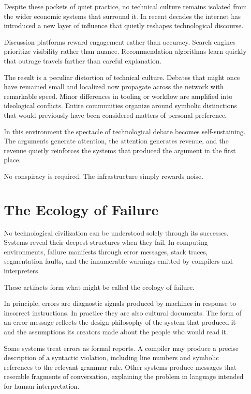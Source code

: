 \documentclass[11pt]{article}
\theoremstyle{definition}
\begin{document}
Despite these pockets of quiet practice, no technical culture remains
isolated from the wider economic systems that surround it. In recent
decades the internet has introduced a new layer of influence that quietly
reshapes technological discourse.

Discussion platforms reward engagement rather than accuracy. Search
engines prioritize visibility rather than nuance. Recommendation
algorithms learn quickly that outrage travels farther than careful
explanation.

The result is a peculiar distortion of technical culture. Debates that
might once have remained small and localized now propagate across the
network with remarkable speed. Minor differences in tooling or workflow
are amplified into ideological conflicts. Entire communities organize
around symbolic distinctions that would previously have been considered
matters of personal preference.

In this environment the spectacle of technological debate becomes
self-sustaining. The arguments generate attention, the attention
generates revenue, and the revenue quietly reinforces the systems that
produced the argument in the first place.

No conspiracy is required. The infrastructure simply rewards noise.

\section{The Ecology of Failure}

No technological civilization can be understood solely through its
successes. Systems reveal their deepest structures when they fail. In
computing environments, failure manifests through error messages,
stack traces, segmentation faults, and the innumerable warnings
emitted by compilers and interpreters.

These artifacts form what might be called the ecology of failure.

In principle, errors are diagnostic signals produced by machines in
response to incorrect instructions. In practice they are also cultural
documents. The form of an error message reflects the design philosophy
of the system that produced it and the assumptions its creators made
about the people who would read it.

Some systems treat errors as formal reports. A compiler may produce a
precise description of a syntactic violation, including line numbers
and symbolic references to the relevant grammar rule. Other systems
produce messages that resemble fragments of conversation, explaining
the problem in language intended for human interpretation.
\end{document}

